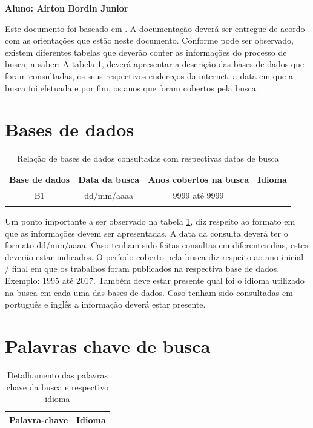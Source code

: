 \documentclass[a4paper,11pt]{article}
\begin{document}

\begin{framed}
\begin{center}
\textbf{Aluno: Airton Bordin Junior}
\end{center}
\end{framed}

Este documento foi baseado em \cite{kitchenham2007guidelines}. A documentação deverá ser entregue de acordo com as orientações que estão neste documento. Conforme pode ser observado, existem diferentes tabelas que deverão conter as informações do processo de busca, a saber: A tabela \ref{tab:tab_bases}, deverá apresentar a descrição das bases de dados que foram consultadas, os seus respectivos endereços da internet, a data em que a busca foi efetuada e por fim, os anos que foram cobertos pela busca. 

\section{Bases de dados}
\begin{table}[ht]
\centering
\begin{tabular}{| c | c | c | c |}
\hline
\textbf{Base de dados} &  \textbf{Data da busca} & \textbf{Anos cobertos na busca} & \textbf{Idioma} \\
\hline
B1 & dd/mm/aaaa & 9999 até 9999 & \multirow{2}{*}{} Português \\
\cline{4-4}
& & & Inglês \\
\hline

\end{tabular}
\caption{Relação de bases de dados consultadas com respectivas datas de busca}
\label{tab:tab_bases}
\end{table}

Um ponto importante a ser observado na tabela \ref{tab:tab_bases}, diz respeito ao formato em que as informações devem ser apresentadas. A data da consulta deverá ter o formato dd/mm/aaaa. Caso tenham sido feitas consultas em diferentes dias, estes deverão estar indicados. O período coberto pela busca diz respeito ao ano inicial / final em que os trabalhos foram publicados na respectiva base de dados. Exemplo: 1995 até 2017. Também deve estar presente qual foi o idioma utilizado na busca em cada uma das bases de dados. Caso tenham sido consultadas em português e inglês a informação deverá estar presente.

\section{Palavras chave de busca}
\begin{table}[ht]
\centering
\begin{tabular}{| l | l |}
\hline
\textbf{Palavra-chave} & \textbf{Idioma} \\
\hline
\end{tabular}
\caption{Detalhamento das palavras chave da busca e respectivo idioma}
\label{tab:tab_palchaves}
\end{table}
\end{document}
